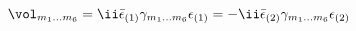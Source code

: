 \begin{equation}
   \vol_{m_1\dots m_6} 
      = \ii \bar{\epsilon}_{(1)}\gamma_{m_1\dots m_6}\epsilon_{(1)}
      = - \ii \bar{\epsilon}_{(2)}\gamma_{m_1\dots m_6}\epsilon_{(2)}
\end{equation}

